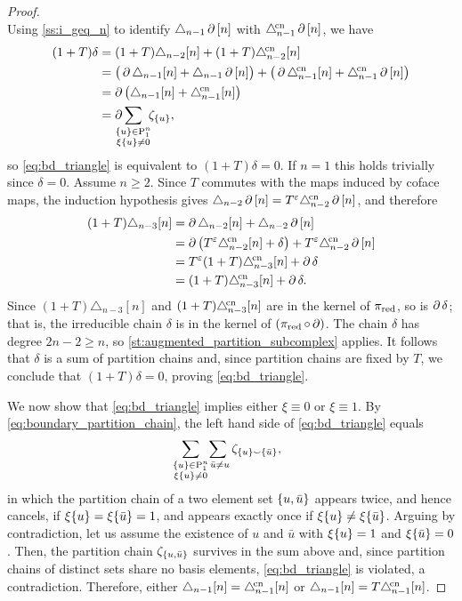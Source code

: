 \begin{proof}
\[	\]
	Using \cref{ss:i_geq_n} to identify $\triangle_{n-1}\operatorname{\partial}\,[n]$ with $\triangle^{\!\mathrm{cn}}_{n-1}\operatorname{\partial}\,[n]$, we have
	\begin{align*}
		(1+T)\delta &=
		(1+T)\triangle_{n-2}[n] + (1+T)\canonical_{n-2}[n] \\ &=
		\big(\bd\triangle_{n-1}[n] + \triangle_{n-1}\bd\,[n]\big) +
		\big(\bd\canonical_{n-1}[n] + \canonical_{n-1}\bd\,[n]\big) \\ &=
		\bd\big(\triangle_{n-1}[n] + \canonical_{n-1}[n]\big) \\ &=
		\bd \sum_{\mathclap{\substack{\set{u} \in \P_1^n \\ \xi \set{u} \neq 0}}} \ \zeta_{\set{u}},
	\end{align*}
	so \cref{eq:bd_triangle} is equivalent to $(1+T)\delta = 0$.
	If $n = 1$ this holds trivially since $\delta = 0$.
	Assume $n \geq 2$.
	Since $T$ commutes with the maps induced by coface maps, the induction hypothesis gives $\triangle_{n-2}\operatorname{\partial}\,[n] = T^\varepsilon \triangle^{\!\mathrm{cn}}_{n-2}\operatorname{\partial}\,[n]$, and therefore
	\begin{align*}
		(1+T)\triangle_{n-3}[n] &=
		\operatorname{\partial}\triangle_{n-2}[n] + \triangle_{n-2}\operatorname{\partial}\,[n] \\ &=
		\operatorname{\partial}\big(T^\varepsilon \triangle^{\!\mathrm{cn}}_{n-2}[n] + \delta\big) + T^\varepsilon \triangle^{\!\mathrm{cn}}_{n-2}\operatorname{\partial}\,[n] \\ &=
		T^\varepsilon (1+T)\triangle^{\!\mathrm{cn}}_{n-3}[n] + \operatorname{\partial}\delta \\ &=
		(1+T)\triangle^{\!\mathrm{cn}}_{n-3}[n] + \operatorname{\partial}\delta.
	\end{align*}
	Since $(1+T)\triangle_{n-3}[n]$ and $(1+T)\triangle^{\!\mathrm{cn}}_{n-3}[n]$ are in the kernel of $\operatorname{\pi_{\text{red}}}$, so is $\operatorname{\partial}\delta$; that is, the irreducible chain $\delta$ is in the kernel of $(\operatorname{\pi_{\text{red}}} \circ \operatorname{\partial})$.
	The chain $\delta$ has degree $2n-2\geq n$, so \cref{st:augmented_partition_subcomplex} applies.
	It follows that $\delta$ is a sum of partition chains and, since partition chains are fixed by $T$, we conclude that $(1+T)\delta = 0$, proving \cref{eq:bd_triangle}.

	We now show that \cref{eq:bd_triangle} implies either $\xi \equiv 0$ or $\xi \equiv 1$.
	By \cref{eq:boundary_partition_chain}, the left hand side of \cref{eq:bd_triangle} equals
	\[
	\sum_{\mathclap{\substack{\set{u} \in \P_1^n \\ \xi \set{u} \neq 0}}} \
	\sum_{\ \bar{u} \neq u} \zeta_{\set{u} \union \set{\bar u}},
	\]
	in which the partition chain of a two element set $\{u, \bar u\}$ appears twice, and hence cancels, if $\xi\{u\} = \xi\{\bar u\} = 1$, and appears exactly once if $\xi\{u\} \neq \xi\{\bar u\}$.
	Arguing by contradiction, let us assume the existence of $u$ and $\bar{u}$ with $\xi\{u\} = 1$ and $\xi\{\bar u\} = 0$.
	Then, the partition chain $\zeta_{\{u, \bar u\}}$ survives in the sum above and, since partition chains of distinct sets share no basis elements, \cref{eq:bd_triangle} is violated, a contradiction.
	Therefore, either $\triangle_{n-1}[n] = \triangle^{\!\mathrm{cn}}_{n-1}[n]$ or $\triangle_{n-1}[n] = T\triangle^{\!\mathrm{cn}}_{n-1}[n]$.
\end{proof}

